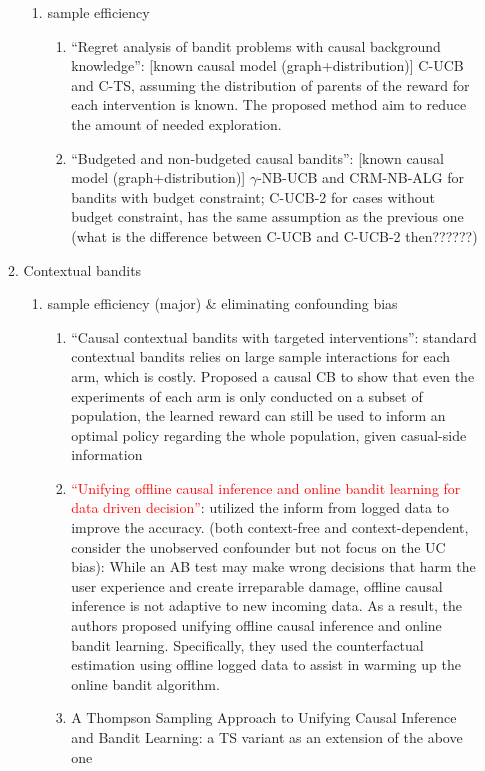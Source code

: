 \begin{enumerate}
\begin{enumerate}
\begin{enumerate}
        \item sample efficiency
            \begin{enumerate}        
                \item “Regret analysis of bandit problems with causal background knowledge”: [known causal model (graph+distribution)] C-UCB and C-TS, assuming the distribution of parents of the reward for each intervention is known. The proposed method aim to reduce the amount of needed exploration. 
                 \item “Budgeted and non-budgeted causal bandits”: [known causal model (graph+distribution)] $\gamma$-NB-UCB and CRM-NB-ALG for bandits with budget constraint; C-UCB-2 for cases without budget constraint, has the same assumption as the previous one (what is the difference between C-UCB and C-UCB-2 then??????)
            \end{enumerate}
        \end{enumerate}
    \item Contextual bandits
        \begin{enumerate}
            \item sample efficiency (major) \& eliminating confounding bias
            \begin{enumerate}
                \item “Causal contextual bandits with targeted interventions”: standard contextual bandits relies on large sample interactions for each arm, which is costly. Proposed a causal CB to show that even the experiments of each arm is only conducted on a subset of population, the learned reward can still be used to inform an optimal policy regarding the whole population, given casual-side information
                \item \textcolor{red}{“Unifying offline causal inference and online bandit learning for data driven decision”}: utilized the inform from logged data to improve the accuracy. (both context-free and context-dependent, consider the unobserved confounder but not focus on the UC bias): While an AB test may make wrong decisions that harm the user experience and create irreparable damage, offline causal inference is not adaptive to new incoming data. As a result, the authors proposed unifying offline causal inference and online bandit learning. Specifically, they used the counterfactual estimation using offline logged data to assist in warming up the online bandit algorithm.
                \item A Thompson Sampling Approach to Unifying Causal Inference and Bandit Learning: a TS variant as an extension of the above one

\end{enumerate}
\end{enumerate}
\end{enumerate}
\end{enumerate}

